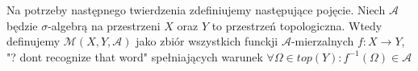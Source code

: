 \begin{defi}
    Na potrzeby następnego twierdzenia zdefiniujemy następujące pojęcie. Niech $\mathcal{A}$ będzie
    $\sigma$-algebrą na przestrzeni $X$ oraz $Y$ to przestrzeń topologiczna. Wtedy definujemy $\mathcal{M}(X,Y,\mathcal{A})$
    jako zbiór wszystkich funckji $\mathcal{A}$-mierzalnych $f:X \rightarrow Y$, {\color{red} "? dont recognize that word"}
    spełniających warunek $\forall \Omega \in top(Y): f^{-1}(\Omega) \in \mathcal{A}$
\end{defi}
